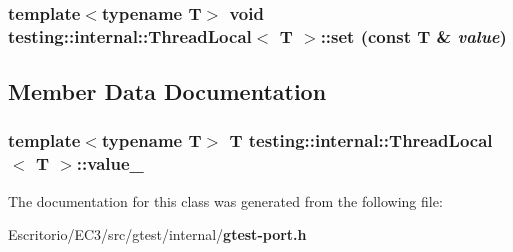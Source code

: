 \subsubsection{\setlength{\rightskip}{0pt plus 5cm}template$<$typename T$>$ void {\bf testing::internal::ThreadLocal}$<$ T $>$::set (const T \& {\em value})\hspace{0.3cm}{\tt  [inline]}}\label{classtesting_1_1internal_1_1ThreadLocal_a6f54ef195c22bbf5cbb8d41c7032a3f}




\subsection{Member Data Documentation}
\subsubsection{\setlength{\rightskip}{0pt plus 5cm}template$<$typename T$>$ T {\bf testing::internal::ThreadLocal}$<$ T $>$::{\bf value\_\-}\hspace{0.3cm}{\tt  [private]}}\label{classtesting_1_1internal_1_1ThreadLocal_b7df109f3e5d2bcb16427e9a4409f835}




The documentation for this class was generated from the following file:\begin{CompactItemize}
\item 
Escritorio/EC3/src/gtest/internal/{\bf gtest-port.h}\end{CompactItemize}
